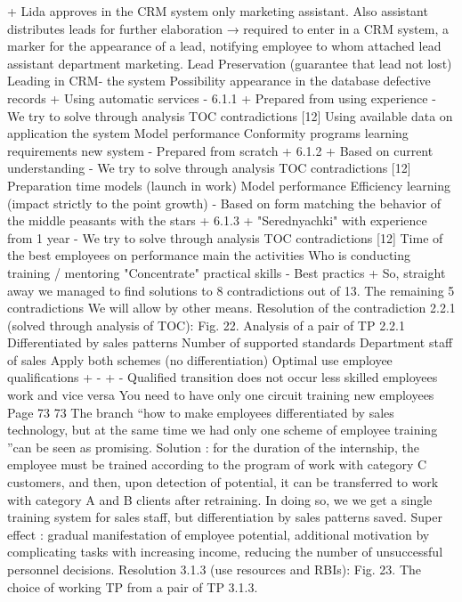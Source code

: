 +
Lida approves in the CRM system only
marketing assistant. Also
assistant distributes leads for
further elaboration → required to enter
in a CRM system, a marker for the appearance of a lead,
notifying employee to whom
attached lead assistant department
marketing.
Lead Preservation
(guarantee that lead
not lost)
Leading in CRM-
the system
Possibility
appearance in the database
defective
records
+
Using
automatic services
-
6.1.1
+
Prepared from
using
experience
-
We try to solve through analysis
TOC contradictions [12]
Using
available data
on application
the system
Model
performance
Conformity
programs
learning
requirements
new system
-
Prepared from scratch
+
6.1.2
+
Based on
current understanding
-
We try to solve through analysis
TOC contradictions [12]
Preparation time
models (launch in
work)
Model
performance
Efficiency
learning
(impact
strictly to the point
growth)
-
Based on
form matching
the behavior of the middle peasants
with the stars
+
6.1.3
+
"Serednyachki" with experience
from 1 year
-
We try to solve through analysis
TOC contradictions [12]
Time of the best
employees on
performance
main
the activities
Who is conducting
training / mentoring
"Concentrate"
practical
skills
-
Best practics
+
So, straight away we managed to find solutions to 8 contradictions out of 13. The remaining 5 contradictions
We will allow by other means.
Resolution of the contradiction 2.2.1 (solved through analysis of TOC):
Fig. 22. Analysis of a pair of TP 2.2.1
Differentiated by
sales patterns
Number of supported
standards
Department staff
of sales
Apply both schemes
(no differentiation)
Optimal use
employee qualifications
+
-
+
-
Qualified transition does not occur
less skilled employees
work and vice versa
You need to have only one circuit
training new employees
Page 73
73
The branch “how to make employees differentiated by sales technology,
but at the same time we had only one scheme of employee training ”can be seen as
promising.
Solution : for the duration of the internship, the employee must be trained according to the program of work with
category C customers, and then, upon detection of potential, it can be transferred
to work with category A and B clients after retraining. In doing so, we
we get a single training system for sales staff, but differentiation by
sales patterns saved.
Super effect : gradual manifestation of employee potential, additional
motivation by complicating tasks with increasing income, reducing the number of unsuccessful
personnel decisions.
Resolution 3.1.3 (use resources and RBIs):
Fig. 23. The choice of working TP from a pair of TP 3.1.3.
